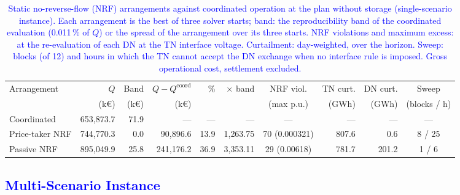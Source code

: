 \begin{table}[htbp!]
    \centering
    \caption{\textcolor{blue}{Static no-reverse-flow (NRF) arrangements against coordinated operation at the plan without storage (single-scenario instance). Each arrangement is the best of three solver starts; band: the reproducibility band of the coordinated evaluation (0.011\,\% of $Q$) or the spread of the arrangement over its three starts. NRF violations and maximum excess: at the re-evaluation of each DN at the TN interface voltage. Curtailment: day-weighted, over the horizon. Sweep: blocks (of 12) and hours in which the TN cannot accept the DN exchange when no interface rule is imposed. Gross operational cost, settlement excluded.}}
    \label{tab:res_benchmark}
    \scriptsize\setlength{\tabcolsep}{2.5pt}
    \begin{tabular}{l r r r r r c r r c}
        \toprule
        Arrangement & $Q$ & Band & $Q - Q^{\text{coord}}$ & \% & $\times$ band & NRF viol. & TN curt. & DN curt. & Sweep \\
                    & (k\euro) & (k\euro) & (k\euro) &  &  & (max p.u.) & (GWh) & (GWh) & (blocks / h) \\
        \midrule
        Coordinated       & 653{,}873.7 & 71.9 & ---         & ---  & ---          & ---            & ---   & ---   & --- \\
        Price-taker NRF   & 744{,}770.3 & 0.0  & 90{,}896.6  & 13.9 & 1{,}263.75   & 70 (0.000321)  & 807.6 & 0.6   & 8 / 25 \\
        Passive NRF       & 895{,}049.9 & 25.8 & 241{,}176.2 & 36.9 & 3{,}353.11   & 29 (0.00618)   & 781.7 & 201.2 & 1 / 6 \\
        \bottomrule
    \end{tabular}
\end{table}

\subsection{\textcolor{blue}{Multi-Scenario Instance}}
\label{subsec:res_multiscenario}

